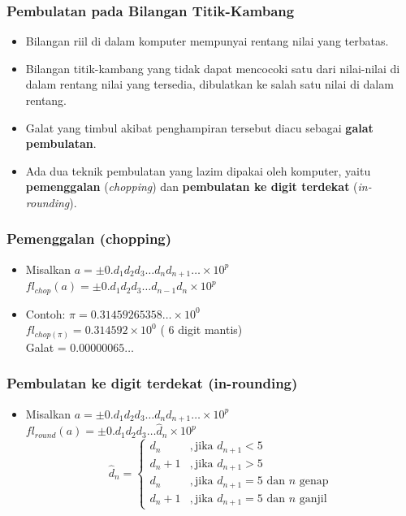 \documentclass[pdflatex,compress]{beamer}
\begin{document}
\begin{frame}
	\frametitle{Pembulatan pada Bilangan Titik-Kambang}
	\begin{itemize}
		\item Bilangan riil di dalam komputer mempunyai rentang nilai yang terbatas.
		\item Bilangan titik-kambang yang tidak dapat mencocoki satu dari nilai-nilai di dalam rentang nilai yang tersedia, dibulatkan ke salah satu nilai di dalam rentang.
		\item Galat yang timbul akibat penghampiran tersebut diacu sebagai \textbf{galat pembulatan}.
		\item Ada dua teknik pembulatan yang lazim dipakai oleh komputer, yaitu \textbf{pemenggalan} (\textit{chopping}) dan \textbf{pembulatan ke digit terdekat} (\textit{in-rounding}).
	\end{itemize}
\end{frame}

\begin{frame}
	\frametitle{Pemenggalan (chopping)}
	\begin{itemize}
		\item Misalkan $ a = \pm 0.d_1 d_2 d_3 \dots d_nd_{n+1} \dots \times 10^p $\\
		$ fl_{chop}(a) = \pm 0.d_1 d_2 d_3 \dots d_{n-1}d_n \times 10^p $
		\item Contoh: $ \pi = 0.31459265358 \dots \times 10^0 $\\
		$ fl_{chop(\pi)} = 0.314592 \times 10^0 $ ( 6 digit mantis)\\
		Galat = $ 0.00000065\dots $
	\end{itemize}
\end{frame}

\begin{frame}
	\frametitle{Pembulatan ke digit terdekat (in-rounding)}
	\begin{itemize}
		\item Misalkan $ a = \pm 0.d_1 d_2 d_3 \dots d_n d_{n+1} \dots \times 10^p $\\
		$ fl_{round}(a) = \pm 0.d_1 d_2 d_3 \dots \hat{d}_n \times 10^p $
		\[
		\hat{d}_n = 
			\begin{cases}
				d_n 	&, \text{jika } d_{n+1} < 5 \\
				d_n + 1 &, \text{jika } d_{n+1} > 5 \\
				d_n 	&, \text{jika } d_{n+1} = 5 \text{ dan } n \text{ genap}\\
				d_n + 1 &, \text{jika } d_{n+1} = 5 \text{ dan } n \text{ ganjil}
			\end{cases}
		\]
	\end{itemize}
\end{frame}
\end{document}
